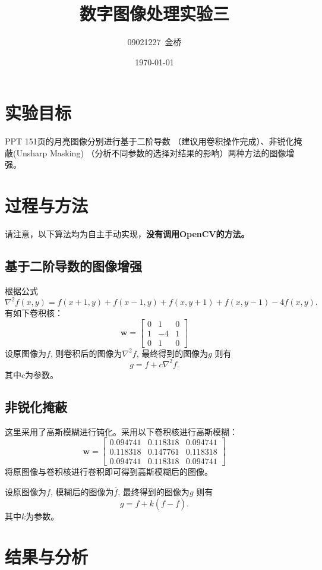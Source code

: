 \documentclass{article}
\title{数字图像处理实验三}
\author{09021227~金桥}
\date{\today}
\begin{document}
\maketitle

\section{实验目标}

PPT 151页的月亮图像分别进行基于二阶导数 （建议用卷积操作完成）、非锐化掩蔽(Unsharp Masking) （分析不同参数的选择对结果的影响）两种方法的图像增强。

\section{过程与方法}

请注意，以下算法均为自主手动实现，\textbf{没有调用OpenCV的方法。}

\subsection{基于二阶导数的图像增强}

根据公式 $$\nabla^2f(x, y)=f(x+1, y)+f(x-1, y)+f(x, y+1)+f(x, y-1)-4f(x, y).$$ 有如下卷积核：
$$
\mathbf{w}=\left[
    \begin{matrix}
        0 & 1 & 0\\
        1 & -4 & 1\\
        0 & 1 & 0
    \end{matrix}
\right]
$$
设原图像为$f$, 则卷积后的图像为$\nabla^2f$, 最终得到的图像为$g$ 则有$$g=f+c\nabla^2f.$$ 其中$c$为参数。

\subsection{非锐化掩蔽}

这里采用了高斯模糊进行钝化。采用以下卷积核进行高斯模糊：
$$
\mathbf{w}=\left[
    \begin{matrix}
        0.094741 & 0.118318 & 0.094741\\
        0.118318 & 0.147761 & 0.118318\\
        0.094741 & 0.118318 & 0.094741
    \end{matrix}
\right]
$$
将原图像与卷积核进行卷积即可得到高斯模糊后的图像。

设原图像为$f$, 模糊后的图像为$\overline{f}$, 最终得到的图像为$g$ 则有$$g=f+k(f-\overline{f}).$$ 其中$k$为参数。

\section{结果与分析}
\end{document}
